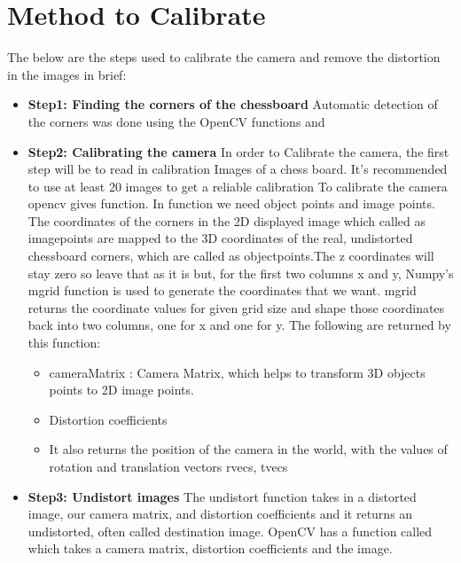 \section{Method to Calibrate}

The below are the steps used to calibrate the camera and remove the distortion in the images in brief: 

\begin{itemize}
	\item \textbf{Step1: Finding the corners of the chessboard} Automatic detection of the corners was done using the OpenCV functions  and 
	\item \textbf{Step2: Calibrating the camera} In order to Calibrate the camera, the first step will be to read in calibration Images of a chess board. It’s recommended to use at least 20 images to get a reliable calibration \cite{Sadekar:2020} To calibrate the camera opencv gives function. 
	In  function we need object points and image points.
	The coordinates of the corners in the 2D displayed image which called as imagepoints are mapped to the 3D coordinates of the real, undistorted chessboard corners, which are called as objectpoints.The z coordinates will stay zero so leave that as it is but, for the first two columns x and y, Numpy’s mgrid function is used to generate the coordinates that we want. mgrid returns the coordinate values for given grid size and shape those coordinates back into two columns, one for x and one for y.
	The following are returned by this function: 
	\begin{itemize}
		\item cameraMatrix : Camera Matrix, which helps to transform 3D objects points to 2D image points.
		\item Distortion coefficients
		\item It also returns the position of the camera in the world, with the values of rotation and translation vectors rvecs, tvecs
	\end{itemize}
	\item \textbf{Step3: Undistort images}	The undistort function takes in a distorted image, our camera matrix, and distortion coefficients and it returns an undistorted, often called destination image.
	OpenCV has a function called  which takes a camera matrix, distortion coefficients and the image.
\end{itemize}

